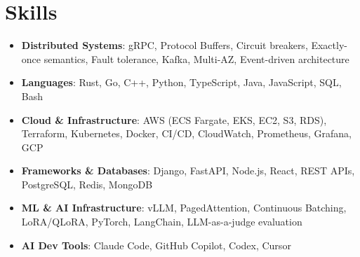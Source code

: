 \documentclass[letterpaper,11pt]{article}
\newcommand{\resumeSubHeadingListStart}{\begin{itemize}[leftmargin=0.15in, label={}]}
\newcommand{\resumeSubHeadingListEnd}{\end{itemize}}
\newcommand{\resumeSkillHeading}[2]{%
  \item\small{\textbf{#1}: #2 \vspace{-9pt}}%
}
\begin{document}
\section{Skills}
  \resumeSubHeadingListStart
    \resumeSkillHeading{Distributed Systems}{gRPC, Protocol Buffers, Circuit breakers, Exactly-once semantics, Fault tolerance, Kafka, Multi-AZ, Event-driven architecture}
    \resumeSkillHeading{Languages}{Rust, Go, C++, Python, TypeScript, Java, JavaScript, SQL, Bash}
    \resumeSkillHeading{Cloud \& Infrastructure}{AWS (ECS Fargate, EKS, EC2, S3, RDS), Terraform, Kubernetes, Docker, CI/CD, CloudWatch, Prometheus, Grafana, GCP}
    \resumeSkillHeading{Frameworks \& Databases}{Django, FastAPI, Node.js, React, REST APIs, PostgreSQL, Redis, MongoDB}
    \resumeSkillHeading{ML \& AI Infrastructure}{vLLM, PagedAttention, Continuous Batching, LoRA/QLoRA, PyTorch, LangChain, LLM-as-a-judge evaluation}
    \resumeSkillHeading{AI Dev Tools}{Claude Code, GitHub Copilot, Codex, Cursor}
  \resumeSubHeadingListEnd
\end{document}
